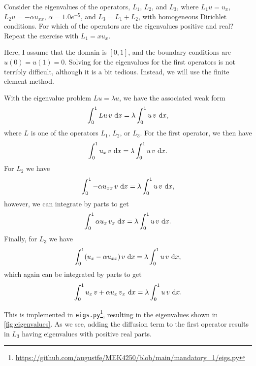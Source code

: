 \begin{exercise}{5.6}
    Consider the eigenvalues of the operators, $L_1$, $L_2$, and $L_3$, where $L_1 u = u_x$, $L_2 u = -\alpha u_{xx}$, $\alpha = 1.0 e^{-5}$, and $L_3 = L_1 + L_2$, with homogeneous Dirichlet conditions.
    For which of the operators are the eigenvalues positive and real?
    Repeat the exercise with $L_1 = x u_x$.
\end{exercise}

\begin{solution}{5.6}
    Here, I assume that the domain is $[0, 1]$, and the boundary conditions are $u(0) = u(1) = 0$.
    Solving for the eigenvalues for the first operators is not terribly difficult, although it is a bit tedious.
    Instead, we will use the finite element method.

    With the eigenvalue problem $L u = \lambda u$, we have the associated weak form
    \begin{equation*}
        \int_0^1 L u \, v \, \mathop{}\!\mathrm{d} x = \lambda \int_0^1 u \, v \, \mathop{}\!\mathrm{d} x,
    \end{equation*}
    where $L$ is one of the operators $L_1$, $L_2$, or $L_3$.
    For the first operator, we then have
    \begin{equation*}
        \int_0^1 u_x \, v \, \mathop{}\!\mathrm{d} x = \lambda \int_0^1 u \, v \, \mathop{}\!\mathrm{d} x.
    \end{equation*}
    For $L_2$ we have
    \begin{equation*}
        \int_{0}^{1} -\alpha u_{xx} \, v \, \mathop{}\!\mathrm{d} x = \lambda \int_{0}^{1} u \, v \, \mathop{}\!\mathrm{d} x,
    \end{equation*}
    however, we can integrate by parts to get
    \begin{equation*}
        \int_{0}^{1} \alpha u_x \, v_x \, \mathop{}\!\mathrm{d} x = \lambda \int_{0}^{1} u \, v \, \mathop{}\!\mathrm{d} x.
    \end{equation*}
    Finally, for $L_3$ we have
    \begin{equation*}
        \int_{0}^{1} (u_x - \alpha u_{xx}) \, v \, \mathop{}\!\mathrm{d} x = \lambda \int_{0}^{1} u \, v \, \mathop{}\!\mathrm{d} x,
    \end{equation*}
    which again can be integrated by parts to get
    \begin{equation*}
        \int_{0}^{1} u_x \, v  + \alpha u_x \, v_x \, \mathop{}\!\mathrm{d} x = \lambda \int_{0}^{1} u \, v \, \mathop{}\!\mathrm{d} x.
    \end{equation*}

    This is implemented in \texttt{eigs.py}\footnote{\url{https://github.com/augustfe/MEK4250/blob/main/mandatory_1/eigs.py}}, resulting in the eigenvalues shown in \cref{fig:eigenvalues}.
    As we see, adding the diffusion term to the first operator results in $L_3$ having eigenvalues with positive real parts.


\end{solution}
